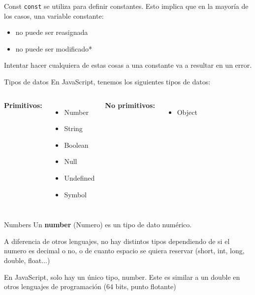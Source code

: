 \documentclass{beamer}
\begin{document}
\begin{frame}[fragile]{Const}
{\verb|const|} se utiliza para definir constantes. Esto implica que en la mayoría de los casos, una variable constante:
\begin{itemize}
    \item no puede ser reasignada
    \item no puede ser modificado*
\end{itemize}

Intentar hacer cualquiera de estas cosas a una constante va a resultar en un error.
\end{frame}

\begin{frame}{Tipos de datos}
En JavaScript, tenemos los siguientes tipos de datos:\bigskip

\begin{columns}[t, onlytextwidth]
                \textbf{Primitivos:}
                \begin{itemize}
                    \item Number
                    \item String
                    \item Boolean
                    \item Null
                    \item Undefined
                    \item Symbol
                \end{itemize}
            
                \textbf{No primitivos:}
                \begin{itemize}
                    \item Object
                \end{itemize}
        \end{columns}
\end{frame}

\begin{frame}{Numbers}
Un \textbf{number} (Numero) es un tipo de dato numérico.

A diferencia de otros lenguajes, no hay distintos tipos dependiendo de si el numero es decimal o no, o de cuanto espacio se quiera reservar (short, int, long, double, float...)

En JavaScript, solo hay un único tipo, number. Este es similar a un double en otros lenguajes de programación (64 bits, punto flotante)
\end{frame}
\end{document}
